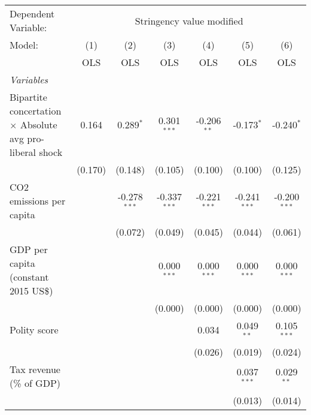 
\begingroup
\centering
\begin{tabular}{lcccccc}
   \toprule
   Dependent Variable: & \multicolumn{6}{c}{Stringency value modified}\\
   Model:                                                          & (1)     & (2)            & (3)            & (4)            & (5)            & (6)\\  
                                                                   &  OLS    & OLS            & OLS            & OLS            & OLS            & OLS\\  
   \midrule
   \emph{Variables}\\
   Bipartite concertation $\times$ Absolute avg pro-liberal shock  & 0.164   & 0.289$^{*}$    & 0.301$^{***}$  & -0.206$^{**}$  & -0.173$^{*}$   & -0.240$^{*}$\\   
                                                                   & (0.170) & (0.148)        & (0.105)        & (0.100)        & (0.100)        & (0.125)\\   
   CO2 emissions per capita                                        &         & -0.278$^{***}$ & -0.337$^{***}$ & -0.221$^{***}$ & -0.241$^{***}$ & -0.200$^{***}$\\   
                                                                   &         & (0.072)        & (0.049)        & (0.045)        & (0.044)        & (0.061)\\   
   GDP per capita (constant 2015 US\$)                             &         &                & 0.000$^{***}$  & 0.000$^{***}$  & 0.000$^{***}$  & 0.000$^{***}$\\   
                                                                   &         &                & (0.000)        & (0.000)        & (0.000)        & (0.000)\\   
   Polity score                                                    &         &                &                & 0.034          & 0.049$^{**}$   & 0.105$^{***}$\\   
                                                                   &         &                &                & (0.026)        & (0.019)        & (0.024)\\   
   Tax revenue (\% of GDP)                                         &         &                &                &                & 0.037$^{***}$  & 0.029$^{**}$\\   
                                                                   &         &                &                &                & (0.013)        & (0.014)\\   

\end{tabular}
